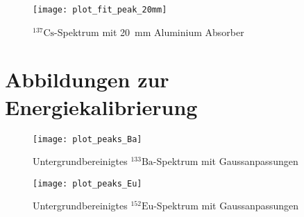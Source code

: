 \documentclass[11pt, ngerman, fleqn, DIV=15, headinclude, BCOR=2cm]{scrreprt}
\begin{document}
\begin{appendix}
\begin{figure}[h]
    \centering
    \texttt{[image: plot\_fit\_peak\_20mm]}
    \caption{%
	    $^{137}\text{Cs}$-Spektrum mit \SI{20}{\milli\metre} Aluminium
	    Absorber
   }
    \label{fig:plot_fit_peak_20mm}
\end{figure}

\clearpage

\section{Abbildungen zur Energiekalibrierung} \label{anhang-energiekalibrierung}
\begin{figure}[h]
    \centering
    \texttt{[image: plot\_peaks\_Ba]}
    \caption{%
	    Untergrundbereinigtes $^{133}\text{Ba}$-Spektrum mit
	    Gaussanpassungen
   }
    \label{fig:plot_peaks_Ba}
\end{figure}

\begin{figure}[h]
    \centering
    \texttt{[image: plot\_peaks\_Eu]}
    \caption{%
	    Untergrundbereinigtes $^{152}\text{Eu}$-Spektrum mit
	    Gaussanpassungen
    }
    \label{fig:plot_peaks_Eu}
\end{figure}





\end{appendix}
\end{document}
